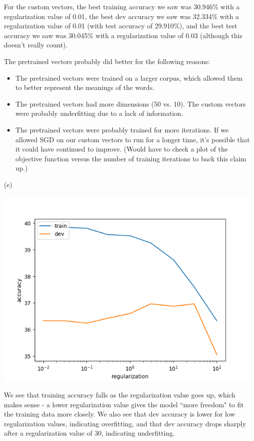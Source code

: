 \documentclass{article}
\begin{document}
For the custom vectors, the best training accuracy we saw was 30.946\% with a regularization value of 0.01, the best dev accuracy we saw was 32.334\% with a regularization value of 0.01 (with test accuracy of 29.910\%), and the best test accuracy we saw was 30.045\% with a regularization value of 0.03 (although this doesn't really count).

The pretrained vectors probably did better for the following reasons:
\begin{itemize}
\item The pretrained vectors were trained on a larger corpus, which allowed them to better represent the meanings of the words.
\item The pretrained vectors had more dimensions (50 vs. 10). The custom vectors were probably underfitting due to a lack of information.
\item The pretrained vectors were probably trained for more iterations. If we allowed SGD on our custom vectors to run for a longer time, it's possible that it could have continued to improve. (Would have to check a plot of the objective function versus the number of training iterations to back this claim up.)
\end{itemize}

(e)

\includegraphics{assignment1/q4_reg_v_acc.png}

We see that training accuracy falls as the regularization value goes up, which makes sense - a lower regularization value gives the model ``more freedom" to fit the training data more closely. We also see that dev accuracy is lower for low regularization values, indicating overfitting, and that dev accuracy drops sharply after a regularization value of 30, indicating underfitting.
\end{document}
